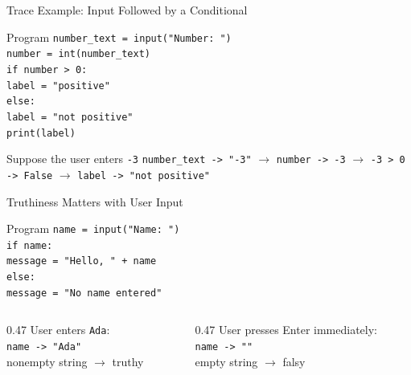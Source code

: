 \documentclass[aspectratio=169,10pt]{beamer}
\begin{document}
\begin{frame}{Trace Example: Input Followed by a Conditional}
  \begin{block}{Program}
    \texttt{number\_text = input("Number: ")}\\
    \texttt{number = int(number\_text)}\\
    \texttt{if number > 0:}\\
    \hspace*{0.20in}\texttt{label = "positive"}\\
    \texttt{else:}\\
    \hspace*{0.20in}\texttt{label = "not positive"}\\
    \texttt{print(label)}
  \end{block}

  \begin{block}{Suppose the user enters \texttt{-3}}
    \texttt{number\_text -> "-3"} $\rightarrow$
    \texttt{number -> -3} $\rightarrow$
    \texttt{-3 > 0 -> False} $\rightarrow$
    \texttt{label -> "not positive"}
  \end{block}
\end{frame}

\begin{frame}{Truthiness Matters with User Input}
  \begin{block}{Program}
    \texttt{name = input("Name: ")}\\
    \texttt{if name:}\\
    \hspace*{0.20in}\texttt{message = "Hello, " + name}\\
    \texttt{else:}\\
    \hspace*{0.20in}\texttt{message = "No name entered"}
  \end{block}

  \begin{columns}[T,onlytextwidth]
    \begin{column}{0.47\textwidth}
      User enters \texttt{Ada}:\\
      \texttt{name -> "Ada"}\\
      nonempty string $\rightarrow$ truthy
    \end{column}

    \begin{column}{0.47\textwidth}
      User presses Enter immediately:\\
      \texttt{name -> ""}\\
      empty string $\rightarrow$ falsy
    \end{column}
  \end{columns}
\end{frame}
\end{document}

